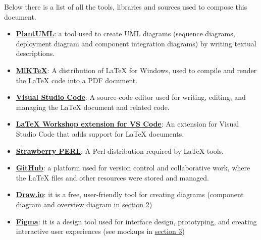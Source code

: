 Below there is a list of all the tools, libraries and sources used to compose this document.
\begin{itemize}
    \item \underline{\textbf{\href{https://plantuml.com}{PlantUML}}}: a tool used to create UML diagrams (sequence diagrams, deployment diagram and component integration diagrams) by writing textual descriptions.
    \item \underline{\textbf{\href{https://miktex.org}{MiKTeX}}}: A distribution of LaTeX for Windows, used to compile and render the LaTeX code into a PDF document.
    \item \underline{\textbf{\href{https://code.visualstudio.com}{Visual Studio Code}}}: A source-code editor used for writing, editing, and managing the LaTeX document and related code.
    \item \underline{\textbf{\href{https://marketplace.visualstudio.com/items?itemName=James-Yu.latex-workshop}{LaTeX Workshop extension for VS Code}}}: An extension for Visual Studio Code that adds support for LaTeX documents.
    \item \underline{\textbf{\href{https://strawberryperl.com}{Strawberry PERL}}}: A Perl distribution required by LaTeX tools.
    \item \underline{\textbf{\href{https://github.com}{GitHub}}}: a platform used for version control and collaborative work, where the LaTeX files and other resources were stored and managed.
    \item \underline{\textbf{\href{https://draw.io}{Draw.io}}}: it is a free, user-friendly tool for creating diagrams (component diagram and overview diagram in \underline{\hyperref[section2]{section 2}})
    \item \underline{\textbf{\href{https://www.figma.com/}{Figma}}}: it is a design tool used for interface design, prototyping, and creating interactive user experiences (see mockups in \underline{\hyperref[section3]{section 3}})
\end{itemize}